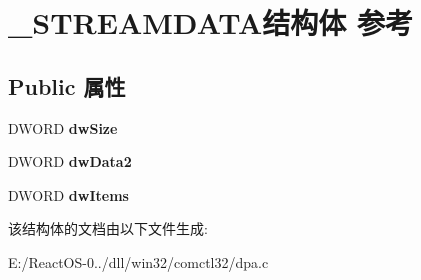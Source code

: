 \hypertarget{struct___s_t_r_e_a_m_d_a_t_a}{}\section{\+\_\+\+S\+T\+R\+E\+A\+M\+D\+A\+T\+A结构体 参考}
\label{struct___s_t_r_e_a_m_d_a_t_a}
\subsection*{Public 属性}
\begin{DoxyCompactItemize}
\item 
\mbox{\label{struct___s_t_r_e_a_m_d_a_t_a_a83c5a91cf915b58760363bb32ab7dedf}} 
D\+W\+O\+RD {\bfseries dw\+Size}
\item 
\mbox{\label{struct___s_t_r_e_a_m_d_a_t_a_a9f10b4ed0d3a08b7d6aa2c77bbc8204e}} 
D\+W\+O\+RD {\bfseries dw\+Data2}
\item 
\mbox{\label{struct___s_t_r_e_a_m_d_a_t_a_a09bfdc9e0b269fe652beb260f1ce0e0c}} 
D\+W\+O\+RD {\bfseries dw\+Items}
\end{DoxyCompactItemize}


该结构体的文档由以下文件生成\+:\begin{DoxyCompactItemize}
\item 
E\+:/\+React\+O\+S-\/0../dll/win32/comctl32/dpa.\+c\end{DoxyCompactItemize}
